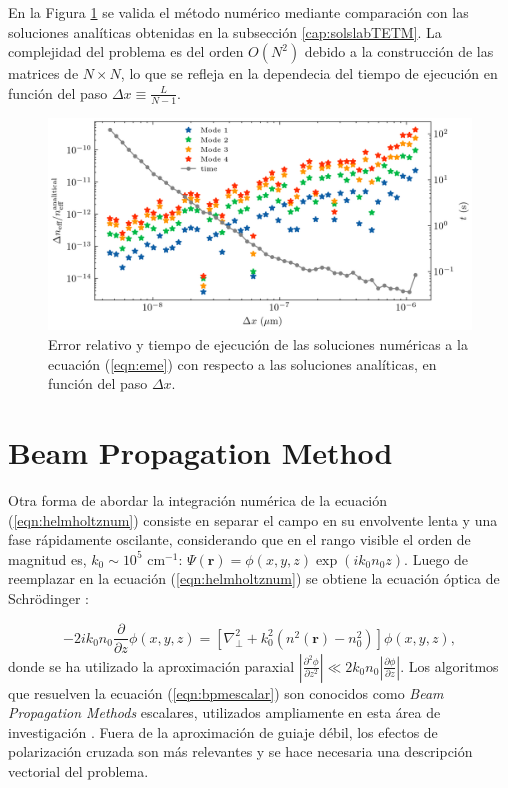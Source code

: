 En la Figura \ref{fig:emenumerror} se valida el método numérico mediante comparación con las soluciones analíticas obtenidas en la subsección \ref{cap:solslabTETM}. La complejidad del problema es del orden $O(N^2)$ debido a la construcción de las matrices de $N\times N$, lo que se refleja en la dependecia del tiempo de ejecución en función del paso $\Delta x \equiv \frac{L}{N-1}$.


\begin{figure}[H]
	\centering
	\includegraphics[width=\linewidth]{media/numerical_slab}
	\caption{Error relativo y tiempo de ejecución de las soluciones numéricas a la ecuación (\ref{eqn:eme}) con respecto a las soluciones analíticas, en función del paso $\Delta x$. \label{fig:emenumerror}}
\end{figure}
\section{Beam Propagation Method} 

Otra forma de abordar la integración numérica de la ecuación (\ref{eqn:helmholtznum}) consiste en separar el campo en su envolvente lenta y una fase rápidamente oscilante, considerando que en el rango visible el orden de magnitud es, $k_0 \sim 10 ^{5} \text{ cm}^{-1}$: $\Psi(\textbf{r}) = \phi(x,y,z)\exp(ik_0 n_0 z)$. Luego de reemplazar en la ecuación (\ref{eqn:helmholtznum}) se obtiene la ecuación óptica de Schrödinger \citep{paraxialschrodinger}:

\begin{equation}
	-2ik_0 n_0\frac{\partial }{\partial z}\phi(x,y, z) =  \left[\nabla_\perp^2 + k_0^2 (n^2(\textbf{r})-n_0^2)\right]\phi(x,y, z), \label{eqn:bpmescalar}
\end{equation} 
donde se ha utilizado la aproximación paraxial $\left| \frac{\partial^2 \phi}{\partial z^2} \right| \ll 2 k_0 n_0\left| \frac{\partial \phi}{\partial z} \right|$. Los algoritmos que resuelven la ecuación (\ref{eqn:bpmescalar}) son conocidos como \textit{Beam Propagation Methods} escalares, utilizados ampliamente en esta área de investigación \cite{bics, interorbital, OAMCaging, vortex, bpm}. Fuera de la aproximación de guiaje débil, los efectos de polarización cruzada son más relevantes y se hace necesaria una descripción vectorial del problema.
